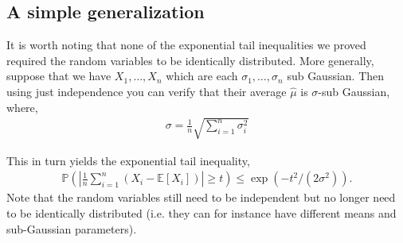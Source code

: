 \documentclass[twoside,12pt]{article}
\begin{document}
\subsection{A simple generalization}
It is worth noting that none of the exponential tail inequalities we proved required the random variables to be identically distributed. More generally, suppose that we have $X_1,\ldots,X_n$ which are each $\sigma_1,\ldots,\sigma_n$ sub Gaussian. Then using just independence you can verify that their average $\widehat{\mu}$ is $\sigma$-sub Gaussian, where,
\begin{align*}
\sigma = \frac{1}{n} \sqrt{\sum_{i=1}^n \sigma_i^2}
\end{align*}

This in turn yields the exponential tail inequality, 
\begin{align*}
\mathbb{P} \left( \left| \frac{1}{n} \sum_{i=1}^n (X_i - \mathbb{E}[X_i])\right| \geq t \right) \leq \exp (- t^2/(2 \sigma^2) ).
\end{align*}
Note that the random variables still need to be independent but no longer need to be identically distributed (i.e. they can for instance have different means and sub-Gaussian parameters).
\end{document}
